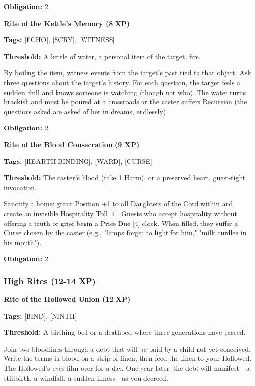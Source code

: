 \textbf{Obligation:} 2

\vspace{0.5em}

\textbf{Rite of the Kettle's Memory (8 XP)}

\textbf{Tags:} [ECHO], [SCRY], [WITNESS]

\textbf{Threshold:} A kettle of water, a personal item of the target, fire.

By boiling the item, witness events from the target's past tied to that object. Ask three questions about the target's history. For each question, the target feels a sudden chill and knows someone is watching (though not who). The water turns brackish and must be poured at a crossroads or the caster suffers Recursion (the questions asked are asked of her in dreams, endlessly).

\textbf{Obligation:} 2

\vspace{0.5em}

\textbf{Rite of the Blood Consecration (9 XP)}

\textbf{Tags:} [HEARTH-BINDING], [WARD], [CURSE]

\textbf{Threshold:} The caster's blood (take 1 Harm), or a preserved heart, guest-right invocation.

Sanctify a home: grant Position +1 to all Daughters of the Cord within and create an invisible Hospitality Toll [4]. Guests who accept hospitality without offering a truth or grief begin a Price Due [4] clock. When filled, they suffer a Curse chosen by the caster (e.g., "lamps forget to light for him," "milk curdles in his mouth").

\textbf{Obligation:} 2

\subsubsection{High Rites (12-14 XP)}

\textbf{Rite of the Hollowed Union (12 XP)}

\textbf{Tags:} [BIND], [NINTH]

\textbf{Threshold:} A birthing bed or a deathbed where three generations have passed.

Join two bloodlines through a debt that will be paid by a child not yet conceived. Write the terms in blood on a strip of linen, then feed the linen to your Hollowed. The Hollowed's eyes film over for a day. One year later, the debt will manifest—a stillbirth, a windfall, a sudden illness—as you decreed.

